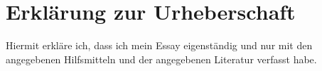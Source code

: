 \section*{Erklärung zur Urheberschaft}
Hiermit erkläre ich, dass ich mein Essay
eigenständig und nur mit den
angegebenen Hilfsmitteln und der
angegebenen Literatur verfasst habe.
